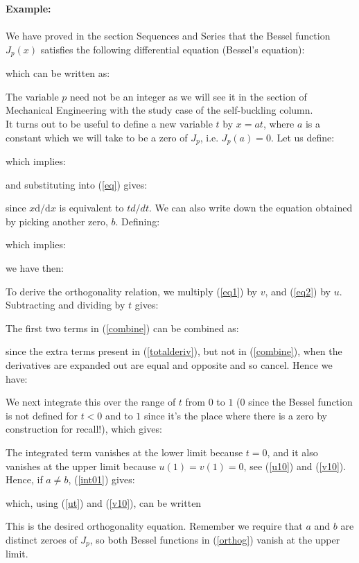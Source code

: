 	\begin{tcolorbox}[colframe=black,colback=white,sharp corners]
	\textbf{{\Large {}}Example:}\\\\
	We have proved in the section Sequences and Series that the Bessel function $J_p(x)$ satisfies the following differential equation (Bessel's equation):
	
	which can be written as:
	
	The variable $p$ need not be an integer as we will see it in the section of Mechanical Engineering with the study case of the self-buckling column.\\
	
	It turns out to be useful to define a new variable $t$ by $x = a t$, where $a$ is a constant which we will take to be a zero of $J_p$, i.e. $J_p(a) = 0$. Let us define:
	
	which implies:
	
	and substituting into (\ref{eq}) gives:
	
	since $x \mathrm{d}/\mathrm{d}x$ is equivalent to $t d/dt$.
	We can also write down the equation obtained by picking another zero, $b$. Defining:
	
	which implies:
	
	we have then:
	
	To derive the orthogonality relation, we multiply (\ref{eq1}) by $v$, and (\ref{eq2}) by $u$. Subtracting and dividing by $t$ gives:
	\end{tcolorbox}
	
	\begin{tcolorbox}[colframe=black,colback=white,sharp corners]
	
	The first two terms in (\ref{combine}) can be combined as:
	
	since the extra terms present in (\ref{totalderiv}), but not in (\ref{combine}), when the derivatives are expanded out are equal and opposite and so cancel. Hence we have:
	
	We next integrate this over the range of $t$ from $0$ to $1$ ($0$ since the Bessel function is not defined for $t<0$ and to $1$ since it's the place where there is a zero by construction for recall!), which gives:
	
	The integrated term vanishes at the lower limit because $t=0$, and it also vanishes at the upper limit because $u(1) = v(1) = 0$, see (\ref{u10}) and (\ref{v10}). Hence, if $a \ne b$, (\ref{int01}) gives:
	
	which, using (\ref{ut}) and (\ref{v10}), can be written
	
	This is the desired orthogonality equation. Remember we require that $a$ and $ b$ are distinct zeroes of $J_p$, so both Bessel functions in (\ref{orthog}) vanish at the upper limit.
	\end{tcolorbox}
	

